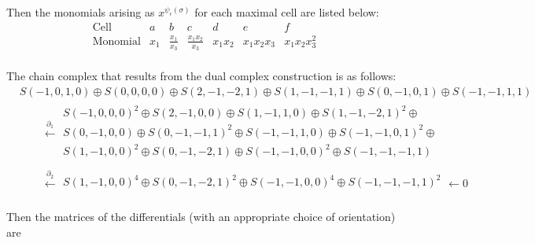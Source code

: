\documentclass{amsart}
\theoremstyle{remark}
\begin{document}
Then the monomials arising as $x^{\psi_\epsilon(\sigma)}$ for each maximal cell are listed below:
  \[\begin{array}{c|cccccc}
    \text{Cell} & a & b & c & d & e & f\\\hline
    \text{Monomial} & x_1 & \frac{x_1}{x_3} & \frac{x_1x_2}{x_3} & x_1x_2 & x_1x_2x_3 & x_1x_2x_3^2\\
  \end{array}\]

  The chain complex that results from the dual complex construction is as follows:
  \begin{equation*}
    \begin{split}
      &
      S(-1,0,1,0)
      \oplus
      S(0,0,0,0)
      \oplus
      S(2,-1,-2,1)
      \oplus
      S(1,-1,-1,1)
      \oplus
      S(0,-1,0,1)
      \oplus
      S(-1,-1,1,1)
    \\[2pt]
    &\qquad \xleftarrow{\partial_1}
    \begin{matrix}
      S(-1,0,0,0)^2%
      \oplus
      S(2,-1,0,0)%
      \oplus
      S(1,-1,1,0) %
      \oplus
      S(1,-1,-2,1)^2 %
      \oplus\\
      S(0,-1,0,0) %
      \oplus
      S(0,-1,-1,1)^2 %
      \oplus
      S(-1,-1,1,0) %
      \oplus
      S(-1,-1,0,1)^2 %
      \oplus\\
      S(1,-1,0,0)^2 %
      \oplus
      S(0,-1,-2,1) %
      \oplus
      S(-1,-1,0,0)^2 %
      \oplus
      S(-1,-1,-1,1) %
      \\
    \end{matrix}\\[2pt]
    & \qquad \xleftarrow{\partial_2}
    \begin{matrix}
      S(1,-1,0,0)^4 %
      \oplus
      S(0,-1,-2,1)^2 %
      \oplus
      S(-1,-1,0,0)^4 %
      \oplus 
      S(-1,-1,-1,1)^2 %
      \\
    \end{matrix} \leftarrow 0
    \end{split}
  \end{equation*}

  Then the matrices of the differentials (with an appropriate choice of orientation) are
\end{document}

